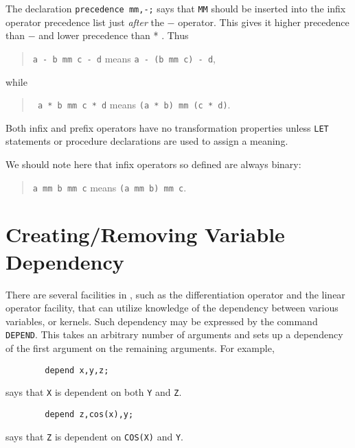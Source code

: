 The declaration \texttt{precedence mm,-;} says that \texttt{MM} should be
inserted into the infix operator precedence list just {\em after\/}
the $-$ operator.  This gives it higher precedence than $-$ and lower
precedence than * .  Thus

\begin{quote}
\hspace{0.2in}\texttt{a - b mm c - d}\hspace{.3in} means \hspace{.3in}
\texttt{a - (b mm c) - d},
\end{quote}
while
\begin{quote}
\hspace{0.2in}\texttt{  a * b mm c * d}\hspace{.3in} means \hspace{.3in}
\texttt{(a * b) mm (c * d)}.
\end{quote}

Both infix and prefix operators have no transformation
properties unless \texttt{LET} statements or procedure
declarations are used to assign a meaning.

We should note here that infix operators so defined are always binary:
\begin{quote}
\hspace{0.2in}\texttt{a mm b mm c}\hspace{.3in} means \hspace{.3in}
\texttt{(a mm b) mm c}.
\end{quote}

\section{Creating/Removing Variable Dependency}
\hypertarget{command:DEPEND}{}
\hypertarget{command:NODEPEND}{}

There are several facilities in {\REDUCE}, such as the differentiation
operator and the linear operator facility, that
can utilize knowledge of the dependency between various variables, or
kernels.  Such dependency may be expressed by the command \texttt{DEPEND}.
This takes an arbitrary number of arguments and
sets up a dependency of the first argument on the remaining arguments.
For example,
\begin{verbatim}
        depend x,y,z;
\end{verbatim}
says that \texttt{X} is dependent on both \texttt{Y} and \texttt{Z}.
\begin{verbatim}
        depend z,cos(x),y;
\end{verbatim}
says that \texttt{Z} is dependent on \texttt{COS(X)} and \texttt{Y}.

